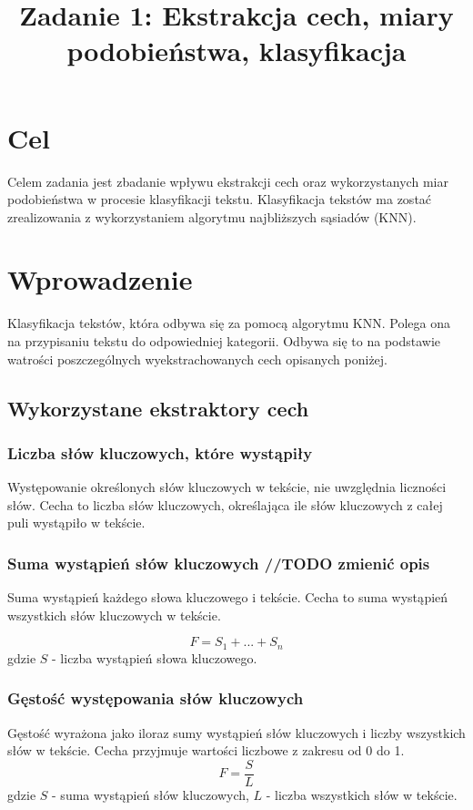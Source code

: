 \documentclass{classrep}
\author{
  \studentinfo{Konrad Jachimstal}{211807} \and
  \studentinfo{ Patryk Janicki}{211951}
}
\title{Zadanie 1: Ekstrakcja cech, miary podobieństwa, klasyfikacja}
\begin{document}
\maketitle

\section{Cel}
{Celem zadania jest zbadanie wpływu ekstrakcji cech oraz wykorzystanych miar podobieństwa w procesie klasyfikacji tekstu. 
Klasyfikacja tekstów ma zostać zrealizowania z wykorzystaniem algorytmu najbliższych sąsiadów (KNN).}

\section{Wprowadzenie}
Klasyfikacja tekstów, która odbywa się za pomocą algorytmu KNN. Polega ona na przypisaniu tekstu do odpowiedniej
kategorii. Odbywa się to na podstawie watrości poszczególnych wyekstrachowanych cech opisanych poniżej.
\subsection{Wykorzystane ekstraktory cech}

\subsubsection{Liczba słów kluczowych, które wystąpiły}
Występowanie określonych słów kluczowych w tekście,
nie uwzględnia liczności słów. Cecha to liczba słów kluczowych,
określająca ile słów kluczowych z całej puli wystąpiło w tekście.

\subsubsection{Suma wystąpień słów kluczowych //TODO zmienić opis}
Suma wystąpień każdego słowa kluczowego i tekście. Cecha to suma wystąpień wszystkich słów kluczowych w tekście.

\begin{equation}
    F=S_{1} + ... + S_{n}
\end{equation}
gdzie $S$ - liczba wystąpień słowa kluczowego.


\subsubsection{Gęstość występowania słów kluczowych}
Gęstość wyrażona jako iloraz sumy wystąpień słów kluczowych i liczby wszystkich słów w tekście.
Cecha przyjmuje wartości liczbowe z zakresu od 0 do 1.
    \begin{equation}
      F=\frac{S}{L}
    \end{equation}
gdzie $S$ - suma wystąpień słów kluczowych, $L$ - liczba wszystkich słów w tekście.
\end{document}
